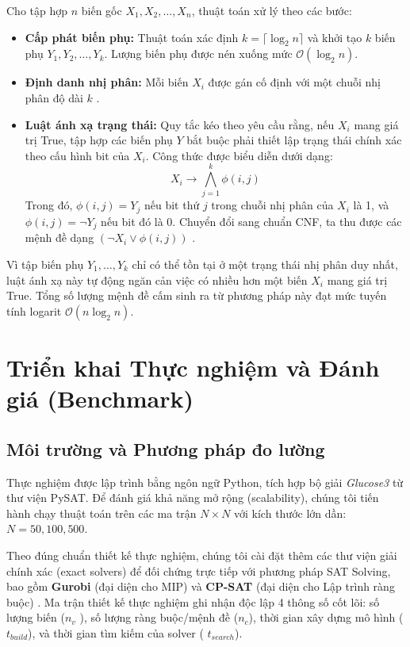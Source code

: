 \documentclass[a4paper,fleqn,numbers]{cas-sc}
\begin{document}
    Cho tập hợp $n$ biến gốc $X_1, X_2, \dots, X_n$, thuật toán xử lý theo các bước:
    \begin{itemize}
        \item \textbf{Cấp phát biến phụ:} Thuật toán xác định $k = \lceil \log_2 n \rceil$ và khởi tạo $k$ biến phụ
        $Y_1, Y_2, \dots, Y_k$\cite{ref_1}. Lượng biến phụ được nén xuống mức $\mathcal{O}(\log_2 n)$\cite{ref_1}.
        \item \textbf{Định danh nhị phân:} Mỗi biến $X_i$ được gán cố định với một chuỗi nhị phân độ dài $k$
        \cite{ref_1}.
        \item \textbf{Luật ánh xạ trạng thái:} Quy tắc kéo theo yêu cầu rằng, nếu $X_i$
        mang giá trị True, tập hợp các biến phụ $Y$ bắt buộc phải thiết lập trạng thái chính xác theo cấu hình bit của
        $X_i$\cite{ref_1}. Công thức được biểu diễn dưới dạng:
        \begin{equation}
            X_i \to \bigwedge_{j=1}^{k} \phi(i,j)
        \end{equation}
        Trong đó, $\phi(i,j) = Y_j$ nếu bit thứ $j$ trong chuỗi nhị phân của $X_i$ là 1, và $\phi(i,j) = \neg Y_j$
        nếu bit đó là 0\cite{ref_1}. Chuyển đổi sang chuẩn CNF, ta thu được các mệnh đề dạng $(\neg X_i \lor \phi(i,j))$
        .
    \end{itemize}
    Vì tập biến phụ $Y_1, \dots, Y_k$
    chỉ có thể tồn tại ở một trạng thái nhị phân duy nhất, luật ánh xạ này tự động ngăn cản việc có nhiều hơn một biến
    $X_i$ mang giá trị True. Tổng số lượng mệnh đề cấm sinh ra từ phương pháp này đạt mức tuyến tính logarit
    $\mathcal{O}(n \log_2 n)$\cite{ref_1}.


    \section{Triển khai Thực nghiệm và Đánh giá (Benchmark)}\label{sec:benchmark}

    \subsection{Môi trường và Phương pháp đo lường}\label{subsec:env}
    Thực nghiệm được lập trình bằng ngôn ngữ Python, tích hợp bộ giải \textit{Glucose3}
    từ thư viện PySAT. Để đánh giá khả năng mở rộng (scalability), chúng tôi tiến hành chạy thuật toán trên các ma trận
    $N \times N$ với kích thước lớn dần: $N = 50, 100, 500$\cite{ref_2}.

    Theo đúng chuẩn thiết kế thực nghiệm, chúng tôi cài đặt thêm các thư viện giải chính xác (exact solvers) để đối
    chứng trực tiếp với phương pháp SAT Solving, bao gồm \textbf{Gurobi} (đại diện cho MIP) và
    \textbf{CP-SAT} (đại diện cho Lập trình ràng buộc)\cite{ref_2}
    . Ma trận thiết kế thực nghiệm ghi nhận độc lập 4 thông số cốt lõi: số lượng biến ($n_v$
    ), số lượng ràng buộc/mệnh đề ($n_c$), thời gian xây dựng mô hình ($t_{build}$), và thời gian tìm kiếm của solver (
    $t_{search}$)\cite{ref_2}.
\end{document}
